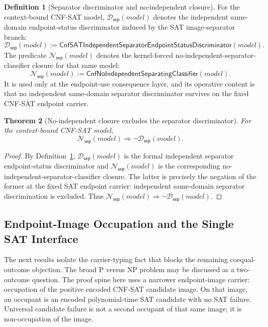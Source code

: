 \documentclass[11pt]{article}
\newtheorem{theorem}{Theorem}[section]
\theoremstyle{definition}
\newtheorem{definition}[theorem]{Definition}
\theoremstyle{remark}
\newcommand{\CnfIndSepDisc}{\mathsf{CnfSATIndependentSeparatorEndpointStatusDiscriminator}}
\newcommand{\CnfNoIndSepClass}{\mathsf{CnfNoIndependentSeparatingClassifier}}
\newcommand{\SepDisc}{\mathcal{D}_{\mathsf{sep}}}
\newcommand{\NoSepDisc}{\mathcal{N}_{\mathsf{sep}}}
\begin{document}
\begin{definition}[Separator discriminator and no-independent closure]\label{def:sepdisc-nosepdisc}
For the context-bound CNF-SAT model, \(\SepDisc(model)\) denotes the independent same-domain endpoint-status discriminator induced by the SAT image-separator branch:
\[
  \SepDisc(model):=\CnfIndSepDisc(model).
\]
The predicate \(\NoSepDisc(model)\) denotes the kernel-forced no-independent-separator-classifier closure for that same model:
\[
  \NoSepDisc(model):=\CnfNoIndSepClass(model).
\]
It is used only at the endpoint-use consequence layer, and its operative content is that no independent same-domain separator discriminator survives on the fixed CNF-SAT endpoint carrier.
\end{definition}

\begin{theorem}[No-independent closure excludes the separator discriminator]\label{thm:no-sepdisc-excludes-sepdisc}
For the context-bound CNF-SAT model,
\[
  \NoSepDisc(model)\Rightarrow\neg\SepDisc(model).
\]
\end{theorem}

\begin{proof}
By Definition~\ref{def:sepdisc-nosepdisc}, \(\SepDisc(model)\) is the formal independent separator endpoint-status discriminator and \(\NoSepDisc(model)\) is the corresponding no-independent-separator-classifier closure. The latter is precisely the negation of the former at the fixed SAT endpoint carrier: independent same-domain separator discrimination is excluded. Thus \(\NoSepDisc(model)\Rightarrow\neg\SepDisc(model)\).
\end{proof}

\subsection{Endpoint-Image Occupation and the Single SAT Interface}\label{subsec:single-sat-interface}

The next results isolate the carrier-typing fact that blocks the remaining coequal-outcome objection. The broad P versus NP problem may be discussed as a two-outcome question. The proof spine here uses a narrower endpoint-image carrier: occupation of the positive encoded CNF-SAT candidate image. On that image, an occupant is an encoded polynomial-time SAT candidate with no SAT failure. Universal candidate failure is not a second occupant of that same image; it is non-occupation of the image.
\end{document}
